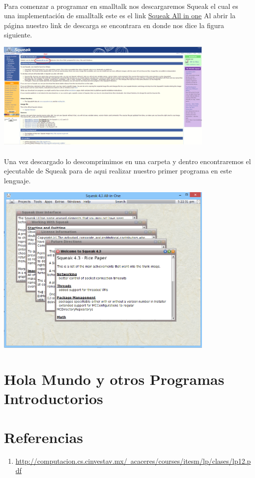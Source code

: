 \documentclass[11pt]{article}
\begin{document}
\paragraph{} \noindent
Para comenzar a programar en smalltalk nos descargaremos Squeak el cual es una implementación de smalltalk este es el link \href{http://www.squeak.org/Download/}{Squeak All in one}
Al abrir la página nuestro link de descarga se encontrara en donde nos dice la figura siguiente.

				\begin{center}
				\includegraphics[width=0.8\textwidth]{./tutorial}
				\end{center}
\paragraph{} \noindent
Una vez descargado lo descomprimimos en una carpeta y dentro encontraremos el ejecutable de Squeak para de aqui realizar nuestro primer programa en este lenguaje.

				\begin{center}
				\includegraphics[width=0.8\textwidth]{./squeak}
				\end{center}

\section{Hola Mundo y otros Programas Introductorios}
\section{Referencias}
\begin{enumerate}
	\item \href{http://computacion.cs.cinvestav.mx/~acaceres/courses/itesm/lp/clases/lp12.pdf}{http://computacion.cs.cinvestav.mx/~acaceres/courses/itesm/lp/clases/lp12.pdf}
\end{enumerate}
\end{document}
